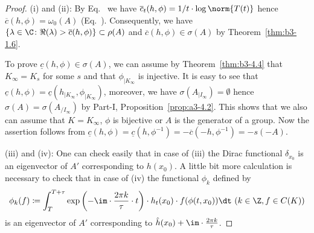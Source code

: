 \begin{proof}	
	(i) and (ii): By Eq.~ we have $\overline{c}_{t}(h,\phi) = 1/t\cdot\log\norm{T(t)}$ hence $\overline{c}(h,\phi) = \omega_{0}(A)$ (\cf Eq.~).  
	Consequently, we have $\{\lambda \in \C \colon \Re(\lambda) > \overline{c}(h,\phi)\} \subset \rho(A)$ and $\overline{c}(h,\phi) \in \sigma(A)$ by Theorem~\ref{thm:b3-1.6}.
	
	To prove $\underline{c}(h,\phi) \in \sigma(A)$, we can assume by Theorem~\ref{thm:b3-4.4} that $K_{\infty} = K_{s}$ for some $s$ and that $\phi_{|K_{\infty}}$ is injective.
	It is easy to see that $\underline{c}(h,\phi) = \underline{c}(h_{|K_{\infty}},\phi_{|K_{\infty}})$, moreover, we have $\sigma(A_{|I_{\infty}}) = \emptyset$ hence $\sigma(A) = \sigma(A_{/I_{\infty}})$ by Part-I, Proposition~\ref{prop:a3-4.2}.
	This shows that we also can assume that $K = K_{\infty}$, \ie $\phi$ is bijective or $A$ is the generator of a group.
	Now the assertion follows from $\underline{c}(h,\phi) = \underline{c}(h,\phi^{-1}) = -\overline{c}(-h,\phi^{-1}) = -s(-A)$.
	
	(iii) and (iv): One can check easily that in case of (iii) the Dirac functional $\delta_{x_{0}}$ is an eigenvector of\/ $A'$ corresponding to $h(x_{0})$.
    A little bit more calculation is necessary to check that in case of (iv) the functional $\phi_{k}$ defined by
\[
	\phi_{k}(f) \coloneq \int_{T}^{T+\tau} \exp\left(-\im\cdot\frac{2\pi k}{\tau}\cdot t\right)\cdot h_{t}(x_{0})\cdot f(\phi(t,x_{0})) \dt  \ (k \in \Z, f \in C(K))
\]
    is an eigenvector of\/ $A'$ corresponding to $\hat{h}(x_{0}) + \im\cdot\frac{2\pi k}{\tau}$.


\end{proof}
